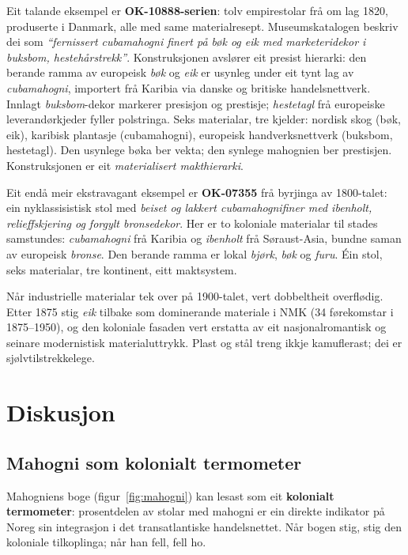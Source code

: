 \documentclass[10pt, a4paper, twocolumn]{article}
\begin{document}
Eit talande eksempel er \textbf{OK-10888-serien}: tolv empirestolar frå om lag 1820, produserte i Danmark, alle med same materialresept. Museumskatalogen beskriv dei som \emph{``fernissert cubamahogni finert på bøk og eik med marketeridekor i buksbom, hestehårstrekk''}. Konstruksjonen avslører eit presist hierarki: den berande ramma av europeisk \emph{bøk} og \emph{eik} er usynleg under eit tynt lag av \emph{cubamahogni}, importert frå Karibia via danske og britiske handelsnettverk. Innlagt \emph{buksbom}-dekor markerer presisjon og prestisje; \emph{hestetagl} frå europeiske leverandørkjeder fyller polstringa. Seks materialar, tre kjelder: nordisk skog (bøk, eik), karibisk plantasje (cubamahogni), europeisk handverksnettverk (buksbom, hestetagl). Den usynlege bøka ber vekta; den synlege mahognien ber prestisjen. Konstruksjonen er eit \emph{materialisert makthierarki}.

Eit endå meir ekstravagant eksempel er \textbf{OK-07355} frå byrjinga av 1800-talet: ein nyklassisistisk stol med \emph{beiset og lakkert cubamahognifiner med ibenholt, relieffskjering og forgylt bronsedekor}. Her er to koloniale materialar til stades samstundes: \emph{cubamahogni} frå Karibia og \emph{ibenholt} frå Søraust-Asia, bundne saman av europeisk \emph{bronse}. Den berande ramma er lokal \emph{bjørk}, \emph{bøk} og \emph{furu}. Éin stol, seks materialar, tre kontinent, eitt maktsystem.

Når industrielle materialar tek over på 1900-talet, vert dobbeltheit overflødig. Etter 1875 stig \emph{eik} tilbake som dominerande materiale i NMK (34 førekomstar i 1875--1950), og den koloniale fasaden vert erstatta av eit nasjonalromantisk og seinare modernistisk materialuttrykk. Plast og stål treng ikkje kamuflerast; dei er sjølvtilstrekkelege.


\section{Diskusjon}

\subsection{Mahogni som kolonialt termometer}

Mahogniens boge (figur~\ref{fig:mahogni}) kan lesast som eit \textbf{kolonialt termometer}: prosentdelen av stolar med mahogni er ein direkte indikator på Noreg sin integrasjon i det transatlantiske handelsnettet. Når bogen stig, stig den koloniale tilkoplinga; når han fell, fell ho.
\end{document}

